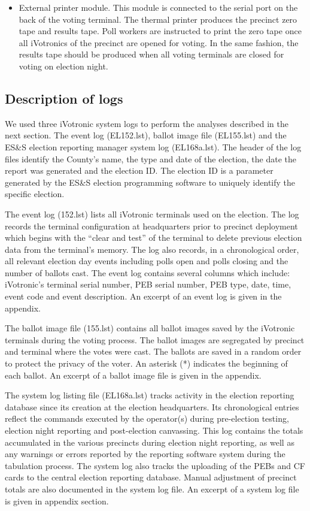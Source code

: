 \documentclass[letterpaper,twocolumn,10pt]{article}
\begin{document}
\begin{itemize}
\item External printer module. This module is connected to the serial port on the back of the voting terminal. The thermal printer produces the precinct zero tape and results tape. Poll workers are instructed to print the zero tape once all iVotronics of the precinct are opened for voting. In the same fashion, the results tape should be produced when all voting terminals are closed for voting on election night.
\end{itemize}

\subsection{Description of logs}
We used three iVotronic system logs to perform the analyses described in the next section. The event log (EL152.lst), ballot image file (EL155.lst) and the ES\&S election reporting manager system log (EL168a.lst).  The header of the log files identify the County's name, the type and date of the election, the date the report was generated and the election ID. The election ID is a parameter generated by the ES\&S election programming software to uniquely identify the specific election.

The event log (152.lst) lists all iVotronic terminals used on the election. The log records the terminal configuration at headquarters prior to precinct deployment which begins with the “clear and test” of the terminal to delete previous election data from the terminal's memory. The log also records, in a chronological order, all relevant election day events including polls open and polls closing and the number of ballots cast.  The event log contains several columns which include: iVotronic's terminal serial number, PEB serial number, PEB type, date, time, event code and event description. An excerpt of  an event log is given in the appendix.

The ballot image file (155.lst) contains all ballot images saved by the iVotronic terminals during the voting process. The ballot images are segregated by precinct and terminal where the votes were cast. The ballots are saved in a random order to protect the privacy of the voter. An asterisk (*) indicates the beginning of each ballot. An excerpt of a ballot image file is given in the appendix.

The system log listing file (EL168a.lst) tracks activity in the election reporting database since its creation at the election headquarters. Its chronological entries reflect the commands executed by the operator(s) during  pre-election testing, election night reporting and post-election canvassing. This log contains the totals accumulated in the various precincts during election night reporting, as well as any warnings or errors reported by the reporting software system during the tabulation process. The system log also tracks the uploading of the PEBs and CF cards to the central election reporting database. Manual adjustment of precinct totals are also documented in the system log file. An excerpt of a system log file is given in appendix section.
\end{document}
